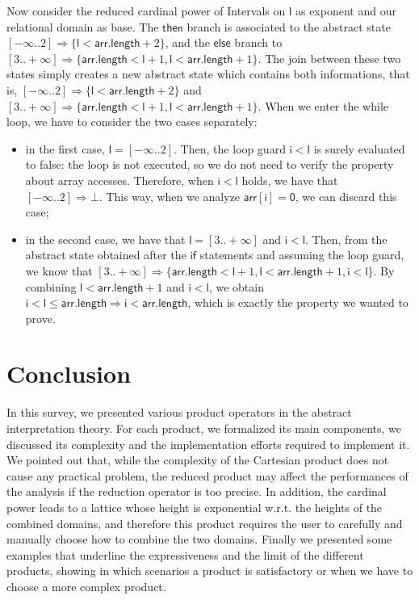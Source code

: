 \documentclass[submission,copyright,creativecommons]{eptcs}
\newcommand{\statement}[1]{\ensuremath{\mathsf{#1}}}
\begin{document}
Now consider the reduced cardinal power of Intervals on \statement{l} as exponent and our relational domain as base. The \statement{then} branch is associated to the abstract state $[-\infty .. 2] \Rightarrow \{\statement{l} < \statement{arr.length} + 2\}$, and the \statement{else} branch to $[3 .. +\infty] \Rightarrow \{ \statement{arr.length} < \statement{l} + 1, \statement{l} < \statement{arr.length} + 1 \}$. The join between these two states simply creates a new abstract state which contains both informations, that is, $[-\infty .. 2] \Rightarrow \{\statement{l} < \statement{arr.length} + 2\}$ and $[3 .. +\infty] \Rightarrow \{ \statement{arr.length} < \statement{l} + 1, \statement{l} < \statement{arr.length} + 1 \}$. When we enter the while loop, we have to consider the two cases separately:
\begin{itemize}
\item in the first case, $\statement{l} = [-\infty .. 2]$. Then, the loop guard $\statement{i} < \statement{l}$ is surely evaluated to false: the loop is not executed, so we do not need to verify the property about array accesses. Therefore, when $\statement{i} < \statement{l}$ holds, we have that $[-\infty .. 2] \Rightarrow \bot$. This way, when we analyze \statement{arr[i]=0}, we can discard this case;
\item in the second case, we have that $\statement{l} = [3 .. +\infty]$ and $\statement{i} < \statement{l}$. Then, from the abstract state obtained after the \statement{if} statements and assuming the loop guard, we know that $[3 .. +\infty] \Rightarrow \{ \statement{arr.length} < \statement{l} + 1, \statement{l} < \statement{arr.length} + 1, \statement{i} < \statement{l} \}$. By combining $\statement{l} < \statement{arr.length} + 1$ and $\statement{i} < \statement{l}$, we obtain $\statement{i} < \statement{l} \leq \statement{arr.length} \Rightarrow \statement{i} < \statement{arr.length}$, which is exactly the property we wanted to prove. 
\end{itemize}


\section{Conclusion}
In this survey, we presented various product operators in the abstract interpretation theory. 
For each product, we formalized its main components, we discussed its complexity and the implementation efforts required to implement it. We pointed out that, while the complexity of the Cartesian product does not cause any practical problem, the reduced product may affect the performances of the analysis if the reduction operator is too precise. In addition, the cardinal power leads to a lattice whose height is exponential w.r.t. the heights of the combined domains, and therefore this product requires the user to carefully and manually choose how to combine the two domains.
Finally we presented some examples that underline the expressiveness and the limit of the different products, showing in which scenarios a product is satisfactory or when we have to choose a more complex product.
\end{document}
